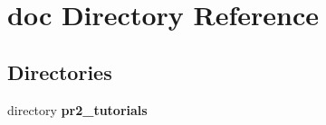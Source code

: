 \section{doc Directory Reference}
\label{dir_e68e8157741866f444e17edd764ebbae}
\subsection*{Directories}
\begin{DoxyCompactItemize}
\item 
directory {\bf pr2\-\_\-tutorials}
\end{DoxyCompactItemize}

